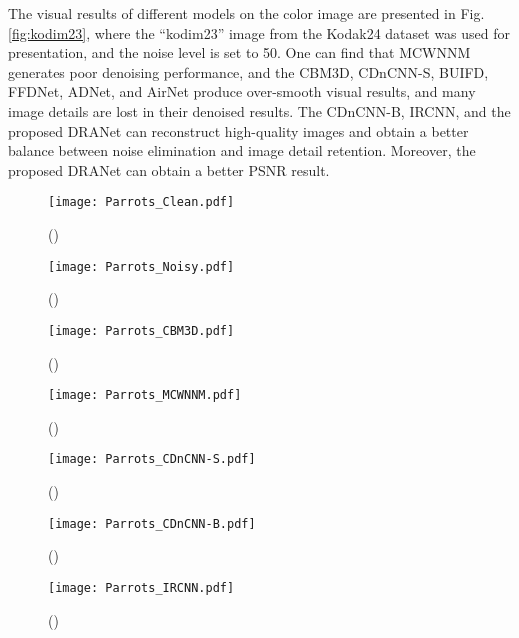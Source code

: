 \documentclass[3p,times]{elsarticle}
\begin{document}
The visual results of different models on the color image are presented in Fig. \ref{fig:kodim23}, where the ``kodim23'' image from the Kodak24 dataset was used for presentation, and the noise level is set to 50. One can find that MCWNNM generates poor denoising performance, and the CBM3D, CDnCNN-S, BUIFD, FFDNet, ADNet, and AirNet produce over-smooth visual results, and many image details are lost in their denoised results. The CDnCNN-B, IRCNN, and the proposed DRANet can reconstruct high-quality images and obtain a better balance between noise elimination and image detail retention. Moreover, the proposed DRANet can obtain a better PSNR result.

\begin{figure*}[htbp]
	\centering
    \captionsetup[subfigure]{labelformat=empty}
	\begin{subfigure}{0.225\linewidth}
		\centering
		\texttt{[image: Parrots\_Clean.pdf]}
		\caption{()}
	\end{subfigure}
    \centering
	\begin{subfigure}{0.225\linewidth}
		\centering
		\texttt{[image: Parrots\_Noisy.pdf]}
		\caption{()}
	\end{subfigure}
    \centering
	\begin{subfigure}{0.225\linewidth}
		\centering
		\texttt{[image: Parrots\_CBM3D.pdf]}
		\caption{()}
	\end{subfigure}
    \centering
	\begin{subfigure}{0.225\linewidth}
		\centering
		\texttt{[image: Parrots\_MCWNNM.pdf]}
		\caption{()}
	\end{subfigure}
    \centering
	\begin{subfigure}{0.225\linewidth}
		\centering
		\texttt{[image: Parrots\_CDnCNN-S.pdf]}
		\caption{()}
	\end{subfigure}
    \centering
    \begin{subfigure}{0.225\linewidth}
		\centering
		\texttt{[image: Parrots\_CDnCNN-B.pdf]}
		\caption{()}
	\end{subfigure}
    \centering
	\begin{subfigure}{0.225\linewidth}
		\centering
		\texttt{[image: Parrots\_IRCNN.pdf]}
		\caption{()}
	\end{subfigure}
    \centering
	\begin{subfigure}{0.225\linewidth}

\end{subfigure}
\end{figure*}
\end{document}
